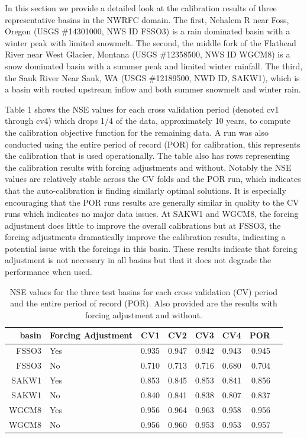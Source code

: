 \documentclass{agujournal2019}
\begin{document}
In this section we provide a detailed look at the calibration results of three representative basins in the NWRFC domain. The first, Nehalem R near Foss, Oregon (USGS \#14301000, NWS ID FSSO3) is a rain dominated basin with a winter peak with limited snowmelt. The second, the middle fork of the Flathead River near West Glacier, Montana (USGS \#12358500, NWS ID WGCM8) is a snow dominated basin with a summer peak and limited winter rainfall. The third, the Sauk River Near Sauk, WA (USGS \#12189500, NWD ID, SAKW1), which is a basin with routed upstream inflow and both summer snowmelt and winter rain. 

Table 1 shows the NSE values for each cross validation period (denoted cv1 through cv4) which drops 1/4 of the data, approximately 10 years, to compute the calibration objective function for the remaining data. A run was also conducted using the entire period of record (POR) for calibration, this represents the calibration that is used operationally. The table also has rows representing the calibration results with forcing adjustments and without. Notably the NSE values are relatively stable across the CV folds and the POR run, which indicates that the auto-calibration is finding similarly optimal solutions. It is especially encouraging that the POR runs results are generally similar in quality to the CV runs which indicates no major data issues. At SAKW1 and WGCM8, the forcing adjustment does little to improve the overall calibrations but at FSSO3, the forcing adjustments dramatically improve the calibration results, indicating a potential issue with the forcings in this basin. These results indicate that forcing adjustment is not necessary in all basins but that it does not degrade the performance when used. 

\begin{table}[ht]
\centering
\begin{tabular}{rllrrrrr}
  \hline
  basin & Forcing Adjustment & CV1 & CV2 & CV3 & CV4 & POR \\ 
  \hline
   FSSO3 & Yes & 0.935 & 0.947 & 0.942 & 0.943 & 0.945 \\ 
   FSSO3 & No  & 0.710 & 0.713 & 0.716 & 0.680 & 0.704 \\ 
   SAKW1 & Yes & 0.853 & 0.845 & 0.853 & 0.841 & 0.856 \\ 
   SAKW1 & No  & 0.840 & 0.841 & 0.838 & 0.807 & 0.837 \\ 
   WGCM8 & Yes & 0.956 & 0.964 & 0.963 & 0.958 & 0.956 \\ 
   WGCM8 & No  & 0.956 & 0.960 & 0.953 & 0.953 & 0.957 \\ 
   \hline
\end{tabular}
\caption{NSE values for the three test basins for each cross validation (CV) period and the entire period of record (POR). Also provided are the results with forcing adjustment and without. }
\end{table}
\end{document}
